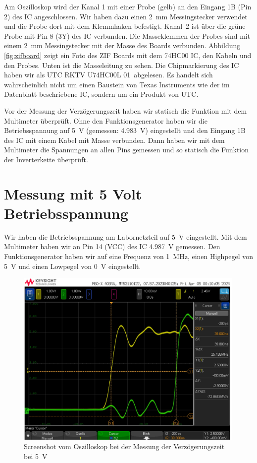 \documentclass[paper=a4,oneside,abstract,DIV=19,parskip=half]{scrartcl}
\begin{document}
Am Oszilloskop wird der Kanal 1 mit einer Probe (gelb) an den Eingang 1B (Pin 2) des IC angeschlossen. Wir haben dazu einen \SI{2}{\mm} Messingstecker verwendet und die Probe dort mit dem Klemmhaken befestigt. Kanal~2 ist über die grüne Probe mit Pin 8 (3Y) des IC verbunden. Die Masseklemmen der Probes sind mit einem \SI{2}{\mm} Messingstecker mit der Masse des Boards verbunden. Abbildung \ref{fig:zifboard} zeigt ein Foto des ZIF Boards mit dem 74HC00 IC, den Kabeln und den Probes. Unten ist die Masseleitung zu sehen. Die Chipmarkierung des IC haben wir als \glqq UTC RKTV U74HC00L 01\grqq\,  abgelesen. Es handelt sich wahrscheinlich nicht um einen Baustein von Texas Instruments wie der im Datenblatt beschriebene IC, sondern um ein Produkt von UTC.

Vor der Messung der Verzögerungszeit haben wir statisch die Funktion mit dem Multimeter überprüft. Ohne den Funktionsgenerator haben wir die Betriebsspannung auf \SI{5}{\V} (gemessen: \SI{4,983}{\V}) eingestellt und den Eingang 1B des IC mit einem Kabel mit Masse verbunden. Dann haben wir mit dem Multimeter die Spannungen an allen Pins gemessen und so statisch die Funktion der Inverterkette überprüft.

\newpage
\section{Messung mit 5 Volt Betriebsspannung}

Wir haben die Betriebsspannung am Labornetzteil auf \SI{5}{\V} eingestellt. Mit dem Multimeter haben wir an Pin 14 (VCC) des IC \SI{4,987}{\V} gemessen. Den Funktionsgenerator haben wir auf eine Frequenz von \SI{1}{\MHz}, einen Highpegel von \SI{5}{\V} und einen Lowpegel von \SI{0}{\V} eingestellt.

\begin{figure}[!htb]
\begin{center}
\includegraphics[width=0.99\textwidth]{messung5v}
\end{center}
\caption{Screenshot vom Oszilloskop bei der Messung der Verzögerungszeit bei \SI{5}{\V}}
\label{fig:mess5v}
\end{figure}
\end{document}
